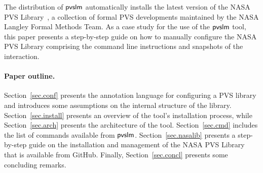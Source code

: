 The distribution of $\textsf{pvslm}$ automatically installs the latest version
of the NASA PVS Library~\cite{nasalib}, a collection of formal PVS
developments maintained by the NASA Langley Formal Methods Team. As a
case study for the use of the $\textsf{pvslm}$ tool, this paper presents a
step-by-step guide on how to manually configure the NASA PVS Library
comprising the command line instructions and snapshots of the
interaction.

\paragraph{Paper outline.} Section~\ref{sec.conf} presents the
annotation language for configuring a PVS library and introduces some
assumptions on the internal structure of the library.
Section~\ref{sec.install} presents an overview of the tool's installation
process, while Section~\ref{sec.arch} presents the architecture of the tool.
Section~\ref{sec.cmd} includes the list of commands available from $\textsf{pvslm}$.
Section~\ref{sec.nasalib} presents a step-by-step guide on the
installation and management of the NASA PVS Library that is available
from GitHub. Finally, Section~\ref{sec.concl} presents some concluding
remarks.

